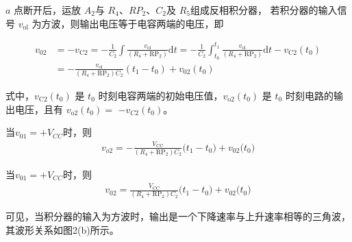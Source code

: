 \documentclass[a4paper,11pt,UTF8]{article}
\begin{document}
\begin{figure}[H]
	\centering
\end{figure}

$a$ 点断开后，运放 $A_2$与 $R_4$、$RP_2$、$C_2$及 $R_5$组成反相积分器，
若积分器的输入信号 $v_\mathrm{ol}$ 为方波，则输出电压等于电容两端的电压，即

\begin{align}
	v_{02}& =-v_{\mathrm{C2}}=-\frac{1}{C_{2}}
    \int\frac{v_{\mathrm{ol}}}{(R_{4}+\mathrm{RP}_{2})}\mathrm{d}t=
    -\frac{1}{C_{2}}\int_{t_{0}}^{t_{1}}\frac{v_{\mathrm{ol}}}{(R_{4}+\mathrm{RP}_{2})}\mathrm{d}t-
    v_{\mathrm{C2}}(t_{0})\nonumber\\ &=-\frac{v_{\mathrm{ol}}}{(R_{4}+\mathrm{RP}_{2})C_{2}}(t_{1}-t_{0})+v_{02}(t_{0})
\end{align}

式中，$v_{\mathrm{C2}}(t_0)$ 是 $t_0$ 时刻电容两端的初始电压值，$v_{\mathrm{o2}}(t_0)$ 
是 $t_0$ 时刻电路的输出电压，且有 $v_{\mathrm{o2}}(t_0)=$ $-v_{C2}(t_0)$。

当$v_{01}=+V_{CC}$时，则
\begin{align}
	v_{o2}=-\frac{V_{\mathrm{CC}}}{(R_{4}+\mathrm{RP}_{2})C_{2}}\big(t_{1}-t_{0}\big)+v_{02}\big(t_{0}\big)
\end{align}

当$v_{01}=+V_{CC}$时，则
\begin{align}
	v_{02}=\frac{V_{\mathrm{CC}}}{(R_{4}+\mathrm{RP}_{2})C_{2}}\big(t_{1}-t_{0}\big)+v_{02}\big(t_{0}\big)
\end{align}

可见，当积分器的输入为方波时，输出是一个下降速率与上升速率相等的三角波，其波形关系如图2(b)所示。
\end{document}
